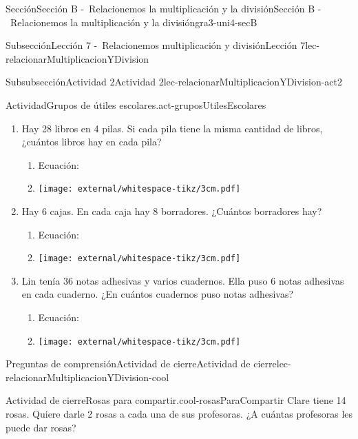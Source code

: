\begin{sectionptx}{Sección}{Sección B -~Relacionemos la multiplicación y la división}{}{Sección B -~Relacionemos la multiplicación y la división}{}{}{gra3-uni4-secB}
\begin{subsectionptx}{Subsección}{Lección 7 -~Relacionemos multiplicación y división}{}{Lección 7}{}{}{lec-relacionarMultiplicacionYDivision}
\begin{subsubsectionptx}{Subsubsección}{Actividad 2}{}{Actividad 2}{}{}{lec-relacionarMultiplicacionYDivision-act2}
\begin{activity}{Actividad}{Grupos de útiles escolares.}{act-gruposUtilesEscolares}
\begin{enumerate}
\begin{enumerate}
\begin{image}{0}{1}{0}{-1.5\baselineskip}
\end{image}%
%
\end{enumerate}
\item{}Hay 28 libros en 4 pilas. Si cada pila tiene la misma cantidad de libros, ¿cuántos libros hay en cada pila?%
%
\begin{enumerate}
\item{}Ecuación: %
\item{}\begin{image}{0}{1}{0}{}%
\texttt{[image: external/whitespace-tikz/3cm.pdf]}
\end{image}%
%
\end{enumerate}
\item{}Hay 6 cajas. En cada caja hay 8 borradores. ¿Cuántos borradores hay?%
%
\begin{enumerate}
\item{}Ecuación: %
\item{}\begin{image}{0}{1}{0}{}%
\texttt{[image: external/whitespace-tikz/3cm.pdf]}
\end{image}%
%
\end{enumerate}
\clearpage
\item{}Lin tenía 36 notas adhesivas y varios cuadernos. Ella puso 6 notas adhesivas en cada cuaderno. ¿En cuántos cuadernos puso notas adhesivas?%
%
\begin{enumerate}
\item{}Ecuación: %
\item{}\begin{image}{0}{1}{0}{}%
\texttt{[image: external/whitespace-tikz/3cm.pdf]}
\end{image}%
%
\end{enumerate}
\end{enumerate}
\end{activity}%
\end{subsubsectionptx}
%
%
\typeout{************************************************}
\typeout{************************************************}
%
\begin{reading-questions-subsubsection}{Preguntas de comprensión}{Actividad de cierre}{}{Actividad de cierre}{}{}{lec-relacionarMultiplicacionYDivision-cool}
\begin{project}{Actividad de cierre}{Rosas para compartir.}{cool-rosasParaCompartir}%
Clare tiene 14 rosas. Quiere darle 2 rosas a cada una de sus profesoras. ¿A cuántas profesoras les puede dar rosas?%

\end{project}
\end{reading-questions-subsubsection}
\end{subsectionptx}
\end{sectionptx}
